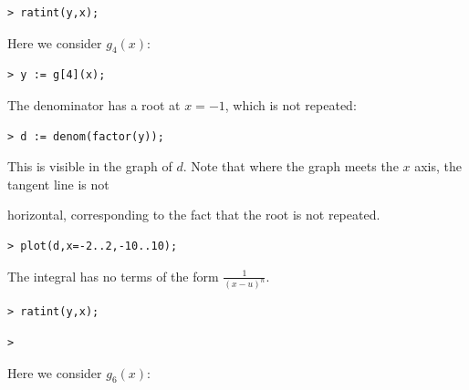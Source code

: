 \documentclass{article}
\begin{document}
\begin{lstlisting}
> ratint(y,x);
\end{lstlisting}
\begin{Maple Normal}

\end{Maple Normal}
\begin{Maple Normal}

\end{Maple Normal}
\begin{Maple Normal}

\end{Maple Normal}
\begin{Maple Normal}
Here we consider 
$g_{4}(x)$:
\end{Maple Normal}
\begin{lstlisting}
> y := g[4](x);
\end{lstlisting}
\begin{Maple Normal}
The denominator has a root at 
$x =-1$, which is not repeated:
\end{Maple Normal}
\begin{lstlisting}
> d := denom(factor(y));
\end{lstlisting}
\begin{Maple Normal}
This is visible in the graph of 
$d$.  Note that where the graph meets the 
$x$ axis, the tangent line is not
\end{Maple Normal}
\begin{Maple Normal}
horizontal, corresponding to the fact that the root is not repeated.
\end{Maple Normal}
\begin{lstlisting}
> plot(d,x=-2..2,-10..10);
\end{lstlisting}
\begin{Maple Normal}
The integral has no terms of the form 
$\frac{1}{(x -u)^{n}}$.
\end{Maple Normal}
\begin{lstlisting}
> ratint(y,x);
\end{lstlisting}
\begin{lstlisting}
> 
\end{lstlisting}
\begin{Maple Normal}

\end{Maple Normal}
\begin{Maple Normal}

\end{Maple Normal}
\begin{Maple Normal}
Here we consider 
$g_{6}(x)$:
\end{Maple Normal}
\end{document}
